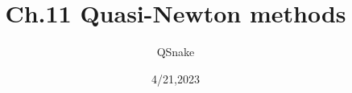 

\title{Ch.11 Quasi-Newton methods} %


\author[QSnake]{QSnake} %


\date{4/21,2023}




\begin{frame}
	\titlepage
\end{frame}
\begin{frame}
	\tableofcontents
\end{frame}


